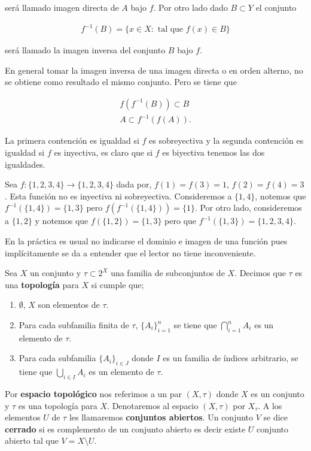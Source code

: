 será llamado imagen directa de $A$ bajo $f$. Por otro lado  dado $B \subset Y$ el conjunto 

\begin{align*}
f^{-1}(B)=\{x \in X :\text{ tal que } f(x) \in B \}
\end{align*}

será llamado la imagen inversa del conjunto $B$ bajo $f$. 

\begin{ob}
En general tomar la imagen inversa de una imagen directa o en orden alterno, no se obtiene como resultado el mismo conjunto. Pero se tiene que
	
	\begin{align*}
	f(f^{-1}(B)) \subset B \\
	A \subset f^{-1}(f(A)) .
	\end{align*}

La primera contención es igualdad si $f$ es sobreyectiva y la segunda contención es igualdad si $f$ es inyectiva, es claro que si $f$ es biyectiva tenemos las dos igualdades. 
\end{ob}

\begin{ej}
Sea $f:\{1,2,3,4\} \to \{1,2,3,4\}$ dada por, $f(1)=f(3)=1$, $f(2)=f(4)=3$. Esta función no es inyectiva ni sobreyectiva. Consideremos a $\{1,4\}$, notemos que $f^{-1}(\{1,4\})=\{1,3\}$ pero $f(f^{-1}(\{1,4\}))=\{1\}$. Por otro lado, consideremos a $\{1,2\}$ y notemos que $f(\{1,2\})=\{1,3\}$  pero que $f^{-1}(\{1,3\})=\{1,2,3,4\}$.
\end{ej}

En la práctica es usual no indicarse el dominio e imagen de una función pues implícitamente se da a entender que el lector no tiene inconveniente.

\begin{df}
Sea $X$ un conjunto y $\tau \subset 2^X$ una familia de subconjuntos de $X$. Decimos que $\tau$ es una \textbf{topología} para $X$ si cumple que;

	\begin{enumerate}
		\item $\emptyset$, $X$ son elementos de  $\tau.$
		\item Para cada subfamilia finita de $\tau$, $\{A_i\}_{i=1}^n$ se tiene que $\bigcap_{i=1}^n A_i$ es un elemento de $\tau.$ 
		\item Para cada subfamilia $\{A_i\}_{i \in J}$ donde $I$ es un familia de índices arbitrario, se tiene que $\bigcup_{i \in I} A_i$ es un elemento de $\tau$.
	\end{enumerate}

Por \textbf{espacio topológico} nos referimos a un par $(X,\tau)$ donde $X$ es un conjunto y $\tau$ es una topología para $X$. Denotaremos al espacio $(X, \tau)$ por $X_{\tau}$. A los elementos $U$ de $\tau$  les llamaremos \textbf{conjuntos abiertos}. Un conjunto $V$ se dice \textbf{cerrado} si es complemento de un conjunto abierto es decir existe $U$ conjunto abierto tal que $V=X \setminus U$.  
\end{df}

